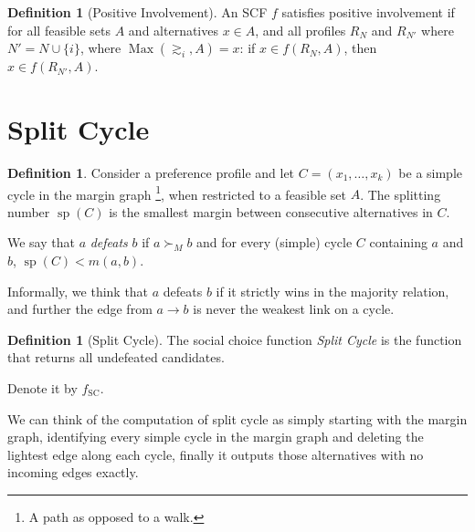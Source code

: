 \documentclass{book}
\theoremstyle{plain}
\theoremstyle{definition}
\newtheorem{definition}[theorem]{Definition}
\theoremstyle{remark}
\begin{document}
\begin{definition}[Positive Involvement]
    An SCF $f$ satisfies positive 
    involvement if for all feasible 
    sets $A$ and alternatives $x \in A$,
    and all profiles $R_N$ and $R_{N'}$ where $N' = N \cup \{i\}$, 
    where $\operatorname{Max}(\gtrsim_i, A) = x$: if $x \in f(R_N, A)$, then $x \in f(R_{N'}, A)$.
\end{definition}


\section{Split Cycle}

\begin{definition}
    Consider a preference profile 
    and let $C = (x_1, \dots, x_k)$ be a 
    simple cycle in the margin graph \footnote{A path as opposed to a walk.}, 
    when restricted to a feasible set $A$.
    The splitting number 
    $\operatorname{sp}(C)$ is the smallest margin between 
    consecutive alternatives in $C$.

    We say that $a$ \emph{defeats} $b$ if 
    $a \succ_M b$ and for every (simple) cycle $C$ containing $a$ and $b$,
    $\operatorname{sp}(C) < m(a, b)$.

    Informally, we think that $a$ defeats $b$ if 
    it strictly wins in the majority relation, and 
    further the edge from $a \to  b$  is never the weakest link on a cycle.
\end{definition}

\begin{definition}[Split Cycle]
    The social choice function 
    \emph{Split Cycle} is the function that returns 
    all undefeated candidates.

    Denote it by $f_{\text{SC}}$.

    We can think of the computation of split cycle as simply 
    starting with the margin graph, identifying every simple cycle in the 
    margin graph and deleting the lightest edge along each cycle, 
    finally it outputs those alternatives with no incoming edges exactly.
\end{definition}
\end{document}
